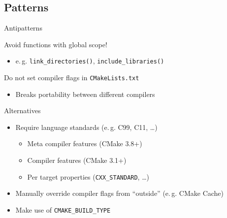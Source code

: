 \documentclass[t]{beamer}
\def\CPP{{C\nolinebreak[4]\hspace{-.05em}\raisebox{.4ex}{\tiny\bf ++}}}
\begin{document}
\subsection{Patterns}

\begin{frame}{Antipatterns}
    \begin{alertblock}{Avoid functions with global scope!}
        \begin{itemize}
            \item e.\,g. \texttt{link\_directories()},
                \texttt{include\_libraries()}
        \end{itemize}
    \end{alertblock}

    \pause

    \begin{alertblock}{Do not set compiler flags in \texttt{CMakeLists.txt}}
        \begin{itemize}
            \item Breaks portability between different compilers
        \end{itemize}
    \end{alertblock}

    \pause

    \begin{exampleblock}{Alternatives}
        \begin{itemize}
            \item Require language standards (e.\,g. C99, \CPP 11, …)
                \begin{itemize}
                    \item Meta compiler features (CMake 3.8+)
                    \item Compiler features (CMake 3.1+)
                    \item Per target properties
                        (\texttt{CXX\_STANDARD}, …)
                \end{itemize}
            \item Manually override compiler flags from
                \enquote{outside} (e.\,g. CMake Cache)
            \item Make use of \texttt{CMAKE\_BUILD\_TYPE}
        \end{itemize}
    \end{exampleblock}
\end{frame}
\end{document}
